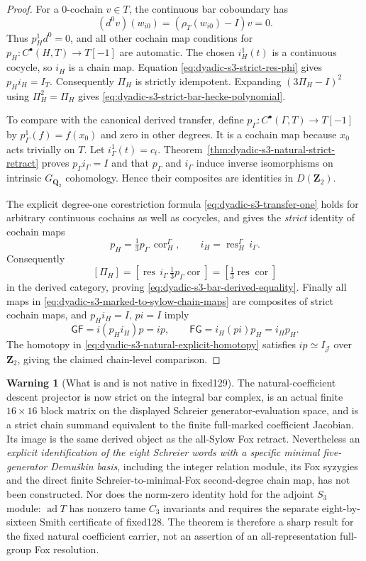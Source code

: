 \documentclass[11pt]{article}
\theoremstyle{definition}
\newtheorem{warning}[theorem]{Warning}
\begin{document}
\begin{proof}
For a $0$-cochain $v\in T$,
the continuous bar coboundary
has
\[
(d^0v)(w_{i0})
=(\rho_T(w_{i0})-I)v=0.
\]
Thus $p_H^1d^0=0$,
and all other cochain
map conditions for
$p_H:C^\bullet(H,T)\to T[-1]$
are automatic.
The chosen $i_H^1(t)$
is a continuous cocycle,
so $i_H$ is a chain map.
Equation
\eqref{eq:dyadic-s3-strict-res-phi}
gives $p_Hi_H=I_T$.
Consequently $\Pi_H$
is strictly idempotent.
Expanding
$(3\Pi_H-I)^2$
using $\Pi_H^2=\Pi_H$
gives
\eqref{eq:dyadic-s3-strict-bar-hecke-polynomial}.

To compare with the canonical
derived transfer, define
$p_\Gamma:C^\bullet(\Gamma,T)\to T[-1]$
by $p_\Gamma^1(f)=f(x_0)$
and zero in other degrees.
It is a cochain map because
$x_0$ acts trivially on $T$.
Let $i_\Gamma^1(t)=c_t$.
Theorem~\ref{thm:dyadic-s3-natural-strict-retract}
proves $p_\Gamma i_\Gamma=I$
and that $p_\Gamma$ and
$i_\Gamma$ induce inverse
isomorphisms on intrinsic
$G_{\mathbf Q_2}$ cohomology.
Hence their composites are
identities in $D(\mathbf Z_2)$.

The explicit degree-one
corestriction formula
\eqref{eq:dyadic-s3-transfer-one}
holds for arbitrary
continuous cochains as
well as cocycles, and
gives the \emph{strict}
identity of cochain maps
\[
p_H=\tfrac13 p_\Gamma
\,\operatorname{cor}_H^\Gamma,
\qquad
i_H=\operatorname{res}_H^\Gamma
\,i_\Gamma.
\]
Consequently
\[
[\Pi_H]=
\left[\operatorname{res}\,
i_\Gamma\,\tfrac13p_\Gamma
\operatorname{cor}\right]
=\left[\tfrac13\operatorname{res}
\operatorname{cor}\right]
\]
in the derived category,
proving
\eqref{eq:dyadic-s3-bar-derived-equality}.
Finally all maps in
\eqref{eq:dyadic-s3-marked-to-sylow-chain-maps}
are composites of strict
cochain maps, and
$p_Hi_H=I$, $pi=I$
imply
\[
\mathsf G\mathsf F
=i(p_Hi_H)p=ip,\qquad
\mathsf F\mathsf G
=i_H(pi)p_H=i_Hp_H.
\]
The homotopy in
\eqref{eq:dyadic-s3-natural-explicit-homotopy}
satisfies $ip\simeq I_{\mathcal J}$
over $\mathbf Z_2$,
giving the claimed chain-level
comparison.
\end{proof}

\begin{warning}[What is and is not native in fixed129]
\label{warn:dyadic-s3-natural-minimal-fox-boundary}
The natural-coefficient descent
projector is now strict on
the integral bar complex,
is an actual finite
$16\times16$ block matrix
on the displayed Schreier
generator-evaluation space,
and is a strict chain
summand equivalent to the
finite full-marked
coefficient Jacobian.
Its image is the same
derived object as the
all-Sylow Fox retract.
Nevertheless an
\emph{explicit identification
of the eight Schreier words
with a specific minimal
five-generator Demu\v{s}kin
basis}, including the
integer relation module,
its Fox syzygies and the
direct finite
Schreier-to-minimal-Fox
second-degree chain map,
has not been constructed.
Nor does the norm-zero
identity hold for the
adjoint $S_3$ module:
$\operatorname{ad}T$ has
nonzero tame $C_3$ invariants
and requires the separate
eight-by-sixteen Smith
certificate of fixed128.
The theorem is therefore
a sharp result for the
fixed natural coefficient
carrier, not an assertion
of an all-representation
full-group Fox resolution.
\end{warning}
\end{document}
